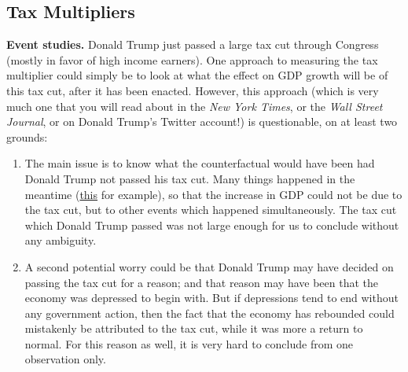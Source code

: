 \documentclass[]{book}
\begin{document}
\subsection{Tax Multipliers}\label{tax-multipliers}

\textbf{Event studies.} Donald Trump just passed a large tax cut through
Congress (mostly in favor of high income earners). One approach to
measuring the tax multiplier could simply be to look at what the effect
on GDP growth will be of this tax cut, after it has been enacted.
However, this approach (which is very much one that you will read about
in the \emph{New York Times}, or the \emph{Wall Street Journal}, or on
Donald Trump's Twitter account!) is questionable, on at least two
grounds:

\begin{enumerate}
\def\labelenumi{\arabic{enumi}.}
\item
  The main issue is to know what the counterfactual would have been had
  Donald Trump not passed his tax cut. Many things happened in the
  meantime
  (\href{https://twitter.com/cdp1882/status/1043469648883331073?lang=en}{this}
  for example), so that the increase in GDP could not be due to the tax
  cut, but to other events which happened simultaneously. The tax cut
  which Donald Trump passed was not large enough for us to conclude
  without any ambiguity.
\item
  A second potential worry could be that Donald Trump may have decided
  on passing the tax cut for a reason; and that reason may have been
  that the economy was depressed to begin with. But if depressions tend
  to end without any government action, then the fact that the economy
  has rebounded could mistakenly be attributed to the tax cut, while it
  was more a return to normal. For this reason as well, it is very hard
  to conclude from one observation only.
\end{enumerate}
\end{document}
